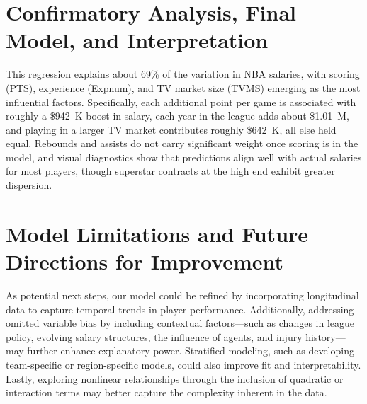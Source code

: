 \documentclass[
  11pt,
]{article}
\begin{document}
\hypertarget{confirmatory-analysis-final-model-and-interpretation}{%
\section{Confirmatory Analysis, Final Model, and Interpretation}\label{confirmatory-analysis-final-model-and-interpretation}}

This regression explains about 69\% of the variation in NBA salaries, with scoring (PTS), experience (Expnum), and TV market size (TVMS) emerging as the most influential factors. Specifically, each additional point per game is associated with roughly a \$942~K boost in salary, each year in the league adds about \$1.01~M, and playing in a larger TV market contributes roughly \$642~K, all else held equal. Rebounds and assists do not carry significant weight once scoring is in the model, and visual diagnostics show that predictions align well with actual salaries for most players, though superstar contracts at the high end exhibit greater dispersion.

\hypertarget{model-limitations-and-future-directions-for-improvement}{%
\section{Model Limitations and Future Directions for Improvement}\label{model-limitations-and-future-directions-for-improvement}}

As potential next steps, our model could be refined by incorporating longitudinal data to capture temporal trends in player performance. Additionally, addressing omitted variable bias by including contextual factors---such as changes in league policy, evolving salary structures, the influence of agents, and injury history---may further enhance explanatory power. Stratified modeling, such as developing team-specific or region-specific models, could also improve fit and interpretability. Lastly, exploring nonlinear relationships through the inclusion of quadratic or interaction terms may better capture the complexity inherent in the data.
\end{document}
